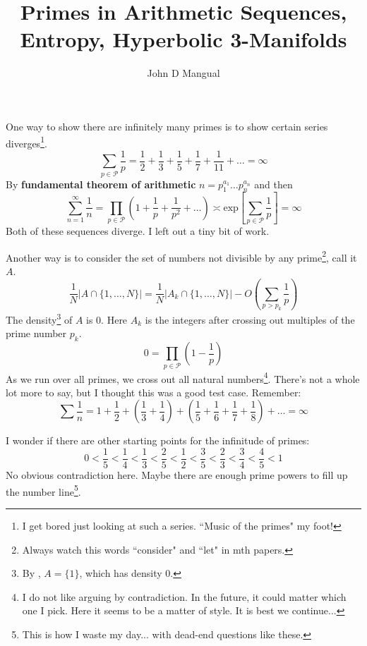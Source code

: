 \documentclass[12pt]{article}
\title{\textbf{ Primes in Arithmetic Sequences, Entropy, Hyperbolic 3-Manifolds }}
\author{John D Mangual}
\date{}
\begin{document}
\selectfont \fontsize{25}{30}\selectfont

\maketitle

\noindent One way to show there are infinitely many primes is to show certain series diverges\footnote{I get bored just looking at such a series. ``Music of the primes" my foot!}.
$$ \sum_{p \in \mathcal{P} }\frac{1}{p}
= \frac{1}{2} + \frac{1}{3} 
+ \frac{1}{5} + \frac{1}{7}+ \frac{1}{11} + \dots = \infty $$
By \textbf {\color{red}fundamental theorem of arithmetic} $n = p_1^{a_1}\dots p_n^{a_n}$ and then
$$ \sum_{n=1}^\infty \frac{1}{n}= \prod_{p \in \mathcal{P}} ( 1 + \frac{1}{p} + \frac{1}{p^2} + \dots ) \asymp \mathrm{exp} \left[\sum_{p \in \mathcal{P}} \frac{1}{p} \right] = \infty$$
Both of these sequences diverge. I left out a tiny bit of work.
\newpage

\noindent Another way is to consider the set of numbers not divisible by any prime\footnote{Always watch this words ``consider" and ``let" in mth papers.}, call it $A$.
$$ \frac{1}{N}|A \cap \{ 1, \dots, N\}| = \frac{1}{N}|A_k \cap \{ 1, \dots, N\} | - O\left(\sum_{p > p_k} \frac{1}{p} \right)$$
The density\footnote{By \textbf{\color{red}{fundamental theorem of arithmetic}}, $A = \{ 1\}$, which has density $0$.} of $A$ is $0$.  Here $A_k$ is the integers after crossing out multiples of the prime number $p_k$.
$$ 0 = \prod_{p \in \mathcal{P}} \left( 1 - \frac{1}{p} \right) $$
As we run over all primes, we cross out all natural numbers\footnote{I do not like arguing by contradiction.  In the future, it could matter which one I pick.  Here it seems to be a matter of style.  It is best we continue...}. \newline \newline
\noindent There's not a whole lot more to say, but I thought this was a good test case.  Remember:
$$ \sum \frac{1}{n} = 1 + \frac{1}{2} + \left( \frac{1}{3} + \frac{1}{4}\right)
+   \left( \frac{1}{5} + \frac{1}{6}
+ \frac{1}{7} + \frac{1}{8}\right) + \dots  = \infty $$
\newpage

\noindent I wonder if there are other starting points for the infinitude of primes:
$$ 0 <  \frac{1}{5}< \frac{1}{4}<\frac{1}{3}< \frac{2}{5}<\frac{1}{2}< \frac{3}{5}<\frac{2}{3}< \frac{3}{4}< \frac{4}{5}< 1 $$
No obvious contradiction here.  Maybe there are enough prime powers to fill up the number line\footnote{This is how I waste my day... with dead-end questions like these.}.
\newline
\end{document}
